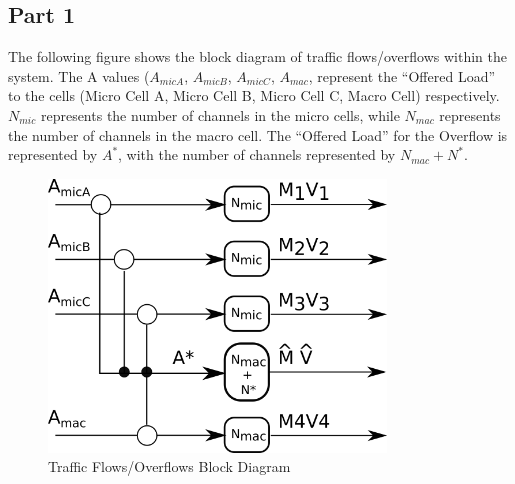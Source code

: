 \subsection{Part 1}

The following figure shows the block diagram of traffic flows/overflows within
the system. The A values ($A_{micA}$, $A_{micB}$, $A_{micC}$, $A_{mac}$, represent the
``Offered Load'' to the cells (Micro Cell A, Micro Cell B, Micro Cell C, Macro
Cell) respectively. $N_{mic}$ represents the number of channels in the micro
cells, while  $N_{mac}$ represents the number of channels in the macro cell. The
``Offered Load'' for the Overflow is represented by $A^*$, with the number of
channels represented by $N_{mac} + N^*$.

\begin{figure}[H]
	\centering
	\includegraphics[width=0.8\textwidth]{images/Q6}
	\caption{Traffic Flows/Overflows Block Diagram}
	\label{fig:images-Q6}
\end{figure}
